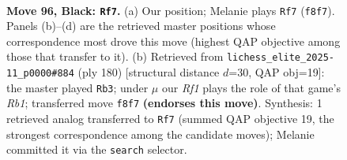 \documentclass[11pt]{article}
\begin{document}
\begin{figure}[p]\centering
\begin{subfigure}{0.46\textwidth}\centering
\resizebox{\linewidth}{!}{%
\newchessgame
\chessboard[
  setfen={5r2/8/p7/P1pk1p1p/1p3P1P/4P1P1/1P6/2R3K1 b - - 4 96},
  showmover=false,
  pgfstyle=straightmove, color=movearrow, markmove={f8-f7}
]}
\caption{}
\end{subfigure}\hfill
\begin{subfigure}{0.46\textwidth}\centering
\resizebox{\linewidth}{!}{%
\newchessgame
\chessboard[
  setfen={8/1p6/p1p1rkp1/P6p/1PK2P1P/4P3/8/1R6 w - - 17 91},
  showmover=false,
  pgfstyle=straightmove, color=movearrow, markmove={b1-b3}
]}
\caption{}
\end{subfigure}
\\[4pt]

\caption{\textbf{Move 96, Black: \texttt{Rf7}.} (a) Our position; Melanie plays \texttt{Rf7} (\texttt{f8f7}). Panels (b)--(d) are the retrieved master positions whose correspondence most drove this move (highest QAP objective among those that transfer to it). (b) Retrieved from \texttt{lichess\_elite\_2025-11\_p0000\#884} (ply 180) [structural distance $d$=30, QAP obj=19]: the master played \texttt{Rb3}; under $\mu$ our \emph{Rf1} plays the role of that game's \emph{Rb1}; transferred move \texttt{f8f7} \textbf{(endorses this move)}. Synthesis: 1 retrieved analog transferred to \texttt{Rf7} (summed QAP objective 19, the strongest correspondence among the candidate moves); Melanie committed it via the \texttt{search} selector.}
\label{fig:thought-m191}
\end{figure}

\clearpage
\end{document}
